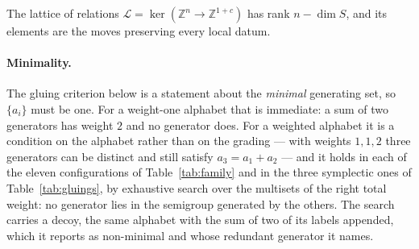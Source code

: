 \documentclass[11pt,a4paper]{article}
\theoremstyle{definition}
\newcommand{\ZZ}{\mathbb{Z}}
\begin{document}
The lattice of relations $\mathcal L=\ker(\ZZ^n\to\ZZ^{1+c})$ has rank $n-\dim S$, and its elements
are the moves preserving every local datum.

\paragraph{Minimality.} The gluing criterion below is a statement about the \emph{minimal}
generating set, so $\{a_i\}$ must be one. For a weight-one alphabet that is immediate: a sum of two
generators has weight $2$ and no generator does. For a weighted alphabet it is a condition on the
alphabet rather than on the grading --- with weights $1,1,2$ three generators can be distinct and
still satisfy $a_3=a_1+a_2$ --- and it holds in each of the eleven configurations of
Table~\ref{tab:family} and in the three symplectic ones of Table~\ref{tab:gluings}, by exhaustive
search over the multisets of the right total weight: no
generator lies in the semigroup generated by the others. The search carries a decoy, the same
alphabet with the sum of two of its labels appended, which it reports as non-minimal and whose
redundant generator it names.
\end{document}
